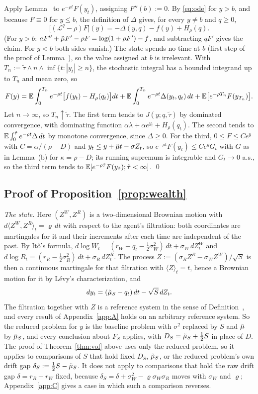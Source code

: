 Apply Lemma~ to $e^{-\rho t}F(y_t)$, assigning $F''(b):=0$. By \eqref{eq:ode} for $y>b$, and because $F\equiv0$ for $y\le b$, the definition of $\Delta$ gives, for every $y\ne b$ and $q\ge0$,
\[
\big[(\mathcal L^q-\rho)F\big](y)=-\Delta(y,q)-f(y)+H_\rho(q).
\]
(For $y>b$: $aF''+\tilde\mu F'-\rho F=\log(1+\rho F')-f$, and subtracting $qF'$ gives the claim. For $y<b$ both sides vanish.) The state spends no time at $b$ (first step of the proof of Lemma~), so the value assigned at $b$ is irrelevant. With $T_n:=\tilde\tau\wedge n\wedge\inf\{t:|y_t|\ge n\}$, the stochastic integral has a bounded integrand up to $T_n$ and mean zero, so
\[
F(y)=\mathbb{E}\int_0^{T_n}e^{-\rho t}\big[f(y_t)-H_\rho(q_t)\big]dt+\mathbb{E}\int_0^{T_n}e^{-\rho t}\Delta(y_t,q_t)\,dt+\mathbb{E}\big[e^{-\rho T_n}F(y_{T_n})\big].
\]
Let $n\to\infty$, so $T_n\uparrow\tilde\tau$. The first term tends to $J(y;q,\tilde\tau)$ by dominated convergence, with dominating function $\alpha\lambda+\alpha e^{y_t}+H_\rho(q_t)$. The second tends to $\mathbb{E}\int_0^{\tilde\tau}e^{-\rho t}\Delta\,dt$ by monotone convergence, since $\Delta\ge0$. For the third, $0\le F\le Ce^{y}$ with $C=\alpha/(\rho-D)$ and $y_t\le y+\tilde\mu t-\sigma Z_t$, so $e^{-\rho t}F(y_t)\le Ce^yG_t$ with $G$ as in Lemma~(b) for $\kappa=\rho-D$; its running supremum is integrable and $G_t\to0$ a.s., so the third term tends to $\mathbb{E}[e^{-\rho\tilde\tau}F(y_{\tilde\tau});\tilde\tau<\infty]$. \qed

\subsection*{Proof of Proposition~\ref{prop:wealth}}

\emph{The state.} Here $(Z^W,Z^R)$ is a two-dimensional Brownian motion with $d\langle Z^W,Z^R\rangle_t=\varrho\,dt$ with respect to the agent's filtration: both coordinates are martingales for it and their increments after each time are independent of the past. By It\^o's formula, $d\log W_t=(r_W-q_t-\tfrac12\sigma_W^2)\,dt+\sigma_W\,dZ^W_t$ and $d\log R_t=(r_R-\tfrac12\sigma_R^2)\,dt+\sigma_R\,dZ^R_t$. The process $Z:=(\sigma_RZ^R-\sigma_WZ^W)/\sqrt S$ is then a continuous martingale for that filtration with $\langle Z\rangle_t=t$, hence a Brownian motion for it by L\'evy's characterization, and
\[
dy_t=(\tilde\mu_S-q_t)\,dt-\sqrt S\,dZ_t .
\]
The filtration together with $Z$ is a reference system in the sense of Definition~, and every result of Appendix~\ref{app:A} holds on an arbitrary reference system. So the reduced problem for $y$ is the baseline problem with $\sigma^2$ replaced by $S$ and $\tilde\mu$ by $\tilde\mu_S$, and every conclusion about $F_S$ applies, with $D_S=\tilde\mu_S+\tfrac12S$ in place of $D$. The proof of Theorem~\ref{thm:vol} above uses only the reduced problem, so it applies to comparisons of $S$ that hold fixed $D_S$, $\tilde\mu_S$, or the reduced problem's own drift gap $\delta_S:=\tfrac12S-\tilde\mu_S$. It does not apply to comparisons that hold the raw drift gap $\delta=r_R-r_W$ fixed, because $\delta_S=\delta+\sigma_W^2-\varrho\sigma_W\sigma_R$ moves with $\sigma_W$ and $\varrho$; Appendix~\ref{app:C} gives a case in which such a comparison reverses.

